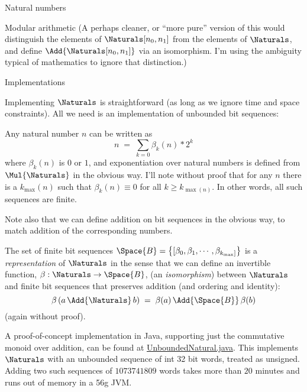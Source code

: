 \documentclass[12pt]{PalisadesLakesBook}
\begin{document}
\begin{plSection}{Natural numbers}
\begin{plSection}{Modular arithmetic}
(A perhaps cleaner, or ``more pure'' version of this
would distinguish the elements of $\Naturals[n_0,n_1]$
from the elements of $\Naturals$,
and define $\Add{\Naturals[n_0,n_1]}$ via an isomorphism.
I'm using the ambiguity typical of mathematics to ignore that
distinction.)

\end{plSection}%
\begin{plSection}{Implementations}

Implementing $\Naturals$ is straightforward 
(as long as we ignore time and space constraints).
All we need is an implementation of unbounded bit sequences:

Any natural number $n$ can be written as
\begin{equation}
n \; = \; \sum_{k=0} \beta_{k}(n) * 2^{k}
\end{equation}
where $\beta_{k}(n)$ is $0$ or $1$,
and exponentiation over natural numbers is defined from
$\Mul{\Naturals}$ in the obvious way.
I'll note without proof that for any $n$ there is a 
$k_{\max}(n)$ such that $\beta_{k}(n) \equiv 0$ for all
$k \geq k_{\max(n)}$.
In other words, all such sequences are finite. 

Note also that we can define addition on bit sequences in the
obvious way, to match addition of the corresponding numbers.

The set of finite bit sequences 
$\Space{B} = \left\{[\beta_{0}, \beta_{1}, \cdots, 
\beta_{k_{\max}]} \right\}$
 is a 
\emph{representation} of $\Naturals$
in the sense that we can define an invertible function,
$\beta : \Naturals \rightarrow \Space{B}$,
(an \emph{isomorphism}) between $\Naturals$ and 
finite bit sequences
that preserves addition (and ordering and identity):
\begin{equation}
\beta \left( a \,\Add{\Naturals} \, b\right)
\;=\;
\beta ( a ) \, \Add{\Space{B}} \, \beta ( b )
\end{equation}
(again without proof).

A proof-of-concept implementation in Java,
supporting just the commutative monoid over addition, 
can be found at
\href{https://github.com/palisades-lakes/nzqr/blob/main/src/main/java/nzqr/java/numbers/UnboundedNatural.java}
{\javaFont UnboundedNatural.java}.
This implements $\Naturals$ with an unbounded sequence
of {\javaFont int} 32 bit words, treated as unsigned.
Adding two such sequences of $1073741809$ words
takes more than $20$ minutes and 
runs out of memory in a 56g JVM.


\end{plSection}
\end{plSection}
\end{document}
